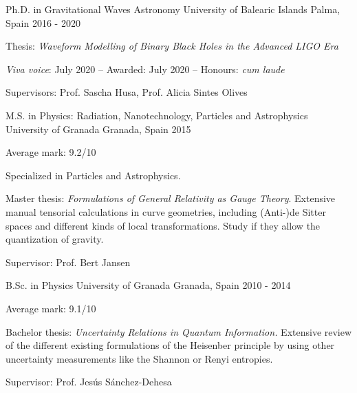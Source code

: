 \begin{cventries}
  \cventry
    {Ph.D. in Gravitational Waves Astronomy}
    {University of Balearic Islands}
    {Palma, Spain}
    {2016 - 2020}
    {
      \begin{cvitems}
        \item {Thesis: \textit{Waveform Modelling of Binary Black Holes in the Advanced LIGO Era} }
        \item {\textit{Viva voice}: July 2020 -- Awarded: July 2020 -- Honours: \textit{cum laude}}
        \item {Supervisors: Prof. Sascha Husa, Prof. Alicia Sintes Olives}
      \end{cvitems}
    }\vspace{-10pt}
    
    \cventry
    {M.S. in Physics: Radiation, Nanotechnology, Particles and Astrophysics}
    {University of Granada}
    {Granada, Spain}
    {2015}
    {
      \begin{cvitems}
        \item {Average mark: 9.2/10}
        \item {Specialized in Particles and Astrophysics.}
        \item {Master thesis: \textit{Formulations of General Relativity as Gauge Theory}. Extensive manual tensorial calculations in curve geometries, including (Anti-)de Sitter spaces and different kinds of local transformations. Study if they allow the quantization of gravity.}
        \item{Supervisor: Prof. Bert Jansen}
      \end{cvitems}
    }\vspace{-10pt}
    
    \cventry
    {B.Sc. in Physics}
    {University of Granada}
    {Granada, Spain}
    {2010 - 2014}
    {
      \begin{cvitems}
        \item {Average mark: 9.1/10}
        \item {Bachelor thesis: \textit{Uncertainty Relations in Quantum Information.} Extensive review of the different existing formulations of the Heisenber principle by using other uncertainty measurements like the Shannon or Renyi entropies.}
        \item{Supervisor: Prof. Jesús Sánchez-Dehesa}
      \end{cvitems}
    }\vspace{-10pt}
    
\end{cventries}
